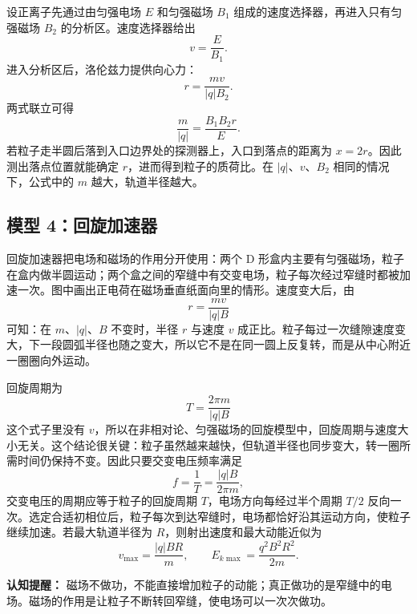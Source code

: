 设正离子先通过由匀强电场 $E$ 和匀强磁场 $B_1$ 组成的速度选择器，再进入只有匀强磁场 $B_2$ 的分析区。速度选择器给出
\[
v=\frac{E}{B_1}.
\]
进入分析区后，洛伦兹力提供向心力：
\[
r=\frac{mv}{|q|B_2}.
\]
两式联立可得
\[
\boxed{\frac{m}{|q|}=\frac{B_1B_2r}{E}}.
\]
若粒子走半圆后落到入口边界处的探测器上，入口到落点的距离为 $x=2r$。因此测出落点位置就能确定 $r$，进而得到粒子的质荷比。在 $|q|$、$v$、$B_2$ 相同的情况下，公式中的 $m$ 越大，轨道半径越大。

\begin{center}
\begin{minipage}{0.95\textwidth}
\centering


\label{fig:mass-spectrometer}
\end{minipage}
\end{center}

\subsection*{模型 4：回旋加速器}

回旋加速器把电场和磁场的作用分开使用：两个 D 形盒内主要有匀强磁场，粒子在盒内做半圆运动；两个盒之间的窄缝中有交变电场，粒子每次经过窄缝时都被加速一次。图中画出正电荷在磁场垂直纸面向里的情形。速度变大后，由
\[
r=\frac{mv}{|q|B}
\]
可知：在 $m$、$|q|$、$B$ 不变时，半径 $r$ 与速度 $v$ 成正比。粒子每过一次缝隙速度变大，下一段圆弧半径也随之变大，所以它不是在同一圆上反复转，而是从中心附近一圈圈向外运动。

\begin{center}


\label{fig:cyclotron-model}
\end{center}

回旋周期为
\[
T=\frac{2\pi m}{|q|B}
\]
这个式子里没有 $v$，所以在非相对论、匀强磁场的回旋模型中，回旋周期与速度大小无关。这个结论很关键：粒子虽然越来越快，但轨道半径也同步变大，转一圈所需时间仍保持不变。因此只要交变电压频率满足
\[
\boxed{f=\frac{1}{T}=\frac{|q|B}{2\pi m}},
\]
交变电压的周期应等于粒子的回旋周期 $T$，电场方向每经过半个周期 $T/2$ 反向一次。选定合适初相位后，粒子每次到达窄缝时，电场都恰好沿其运动方向，使粒子继续加速。若最大轨道半径为 $R$，则射出速度和最大动能近似为
\[
v_{\max}=\frac{|q|BR}{m},\qquad E_{k\max}=\frac{q^2B^2R^2}{2m}.
\]

\textbf{认知提醒：} 磁场不做功，不能直接增加粒子的动能；真正做功的是窄缝中的电场。磁场的作用是让粒子不断转回窄缝，使电场可以一次次做功。

